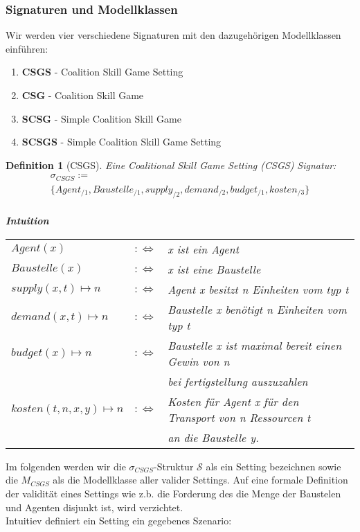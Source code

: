 \documentclass[12pt]{article}
\theoremstyle{break}
\newtheorem{definition}{Definition}
\begin{document}
\subsubsection{Signaturen und Modellklassen}

Wir werden vier verschiedene Signaturen mit den dazugehörigen Modellklassen einführen:
\begin{enumerate}
  \item \textbf{CSGS} - Coalition Skill Game Setting
  \item \textbf{CSG} - Coalition Skill Game
  \item \textbf{SCSG} - Simple Coalition Skill Game
  \item \textbf{SCSGS} - Simple Coalition Skill Game Setting
\end{enumerate}

\begin{definition}[CSGS]
  Eine Coalitional Skill Game Setting (CSGS) Signatur:\\
  \begin{eqnarray}
   \sigma_{CSGS}:= \\
   \{Agent_{/1}, Baustelle_{/1}, supply_{/2}, demand_{/2}, budget_{/1}, kosten_{/3} \}
  \end{eqnarray}
    \\ \textbf{Intuition} \\
    \begin{tabular}{lrl}
    $Agent(x)$&$:\Leftrightarrow$& x ist ein Agent \\
    $Baustelle(x) $&$:\Leftrightarrow$& x ist eine Baustelle \\
    $supply(x, t)\mapsto n $&$:\Leftrightarrow$& Agent x besitzt n Einheiten vom typ t \\
    $demand(x, t)\mapsto n $&$:\Leftrightarrow$& Baustelle x benötigt n Einheiten vom typ t \\
    $budget(x)\mapsto n $&$:\Leftrightarrow$&
    Baustelle x ist maximal bereit einen Gewin von n\\&& bei fertigstellung auszuzahlen\\
    $kosten(t, n, x, y)\mapsto n$&$:\Leftrightarrow$& Kosten für Agent x für den Transport von n Ressourcen t\\&& an die Baustelle y.
    \end{tabular}
\end{definition}

Im folgenden werden wir die $\sigma_{CSGS}$-Struktur $\mathcal{S}$ als ein Setting bezeichnen sowie die $M_{CSGS}$ als die Modellklasse aller valider Settings.
Auf eine formale Definition der validität eines Settings wie z.b. die Forderung des die Menge der Baustelen und Agenten disjunkt ist, wird verzichtet.
\\
Intuitiev definiert ein Setting ein gegebenes Szenario:
\end{document}

